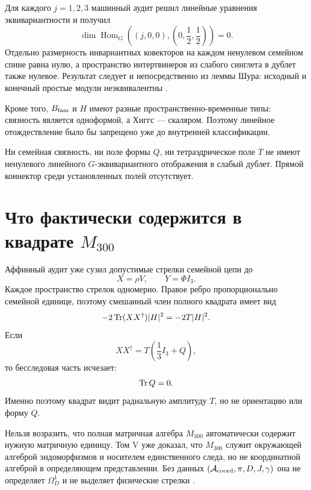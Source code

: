 Для каждого $j=1,2,3$ машинный аудит решил линейные уравнения
эквивариантности и получил
\begin{equation}
 \dim\operatorname{Hom}_{G}
 \left((j,0,0),\left(0,\frac12,\frac12\right)\right)=0.
 \label{eq:v6-direct-connector-zero-hom}
\end{equation}
Отдельно размерность инвариантных ковекторов на каждом ненулевом
семейном спине равна нулю, а пространство интертвинеров из слабого
синглета в дублет также нулевое. Результат следует и непосредственно из
леммы Шура: исходный и конечный простые модули неэквивалентны
\cite{vortex-connector-krajewski1998,vortex-connector-paschke1997}.

Кроме того, $B_{\rm fam}$ и $H$ имеют разные пространственно-временные
типы: связность является одноформой, а Хиггс --- скаляром. Поэтому
линейное отождествление было бы запрещено уже до внутренней
классификации.

\begin{theorem}
Ни семейная связность, ни поле формы $Q$, ни тетраэдрическое поле $T$ не
имеют ненулевого линейного $G$-эквивариантного отображения в слабый
дублет. Прямой коннектор среди установленных полей отсутствует.
\end{theorem}

\section{Что фактически содержится в квадрате \texorpdfstring{$M_{300}$}{M300}}

Аффинный аудит уже сузил допустимые стрелки семейной цепи до
\begin{equation}
 X=\rho V,
 \qquad
 Y=\Phi I_3.
 \label{eq:v6-existing-radial-arrows}
\end{equation}
Каждое пространство стрелок одномерно. Правое ребро пропорционально
семейной единице, поэтому смешанный член полного квадрата имеет вид
\begin{equation}
 -2\operatorname{Tr}(XX^\dagger)|H|^2=-2T|H|^2.
\end{equation}
Если
\begin{equation}
 XX^\dagger=T\left(\frac13I_3+Q\right),
\end{equation}
то бесследовая часть исчезает:
\begin{equation}
 \operatorname{Tr} Q=0.
\end{equation}
Именно поэтому квадрат видит радиальную амплитуду $T$, но не ориентацию
или форму $Q$.

Нельзя возразить, что полная матричная алгебра $M_{300}$ автоматически
содержит нужную матричную единицу. Том V уже доказал, что $M_{300}$
служит окружающей алгеброй эндоморфизмов и носителем единственного следа,
но не координатной алгеброй в определяющем представлении. Без данных
$(\mathcal A_{\rm coord},\pi,D,J,\gamma)$ она не определяет
$\Omega_D^1$ и не выделяет физические стрелки
\cite{vortex-connector-krajewski1998,vortex-connector-paschke1997}.

